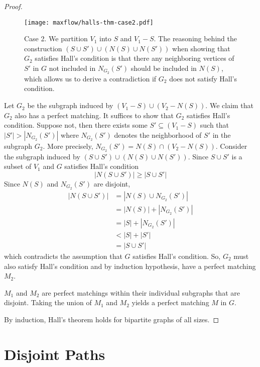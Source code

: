 \begin{proof}
    \begin{figure}[htbp]
        \centering
        \texttt{[image: maxflow/halls-thm-case2.pdf]}
        \caption{Case 2. We partition $V_1$ into $S$ and $V_1-S$. The reasoning behind the construction $(S \cup S') \cup (N(S) \cup N(S'))$ when showing that $G_2$ satisfies Hall's condition is that there any neighboring vertices of $S'$ in $G$ not included in $N_{G_2}(S')$ should be included in $N(S)$, which allows us to derive a contradiction if $G_2$ does not satisfy Hall's condition.}
        \label{fig:halls-thm-case2}
    \end{figure}

    Let $G_2$ be the subgraph induced by $(V_1 - S) \cup (V_2 - N(S))$. We claim that $G_2$ also has a perfect matching. It suffices to show that $G_2$ satisfies Hall's condition. Suppose not, then there exists some $S' \subseteq (V_1-S)$ such that $|S'| > |N_{G_2}(S')|$ where $N_{G_2}(S')$ denotes the neighborhood of $S'$ in the subgraph $G_2$. More precisely, $N_{G_2}(S') = N(S) \cap (V_2-N(S))$. Consider the subgraph induced by $(S \cup S') \cup (N(S) \cup N(S'))$. Since $S \cup S'$ is a subset of $V_1$ and $G$ satisfies Hall's condition
    $$
    |N(S \cup S')| \geq |S \cup S'|
    $$
    Since $N(S)$ and $N_{G_2}(S')$ are disjoint,
    $$
    \begin{aligned}
        |N(S \cup S')| &= |N(S) \cup N_{G_2}(S')| \\
        &= |N(S)| + |N_{G_2}(S')| \\
        &= |S| + |N_{G_2}(S')| \\
        &< |S| + |S'| \\
        &= |S \cup S'|
    \end{aligned}
    $$
    which contradicts the assumption that $G$ satisfies Hall's condition. So, $G_2$ must also satisfy Hall's condition and by induction hypothesis, have a perfect matching $M_2$.

    $M_1$ and $M_2$ are perfect matchings within their individual subgraphs that are disjoint. Taking the union of $M_1$ and $M_2$ yields a perfect matching $M$ in $G$.

    By induction, Hall's theorem holds for bipartite graphs of all sizes.
\end{proof}

\section{Disjoint Paths} 

